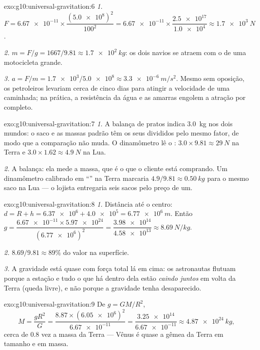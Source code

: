 \begin{solution}{exo:g10:universal-gravitation:6}
\emph{1.} $F = \num{6.67e-11} \times
\dfrac{(\num{5.0e8})^2}{100^2}
= \num{6.67e-11} \times \dfrac{\num{2.5e17}}{\num{1.0e4}}
\approx \qty{1.7e3}{N}$.

\emph{2.} $m = F/g = 1667/9.81 \approx \qty{1.7e2}{kg}$: os dois navios
se atraem com o  de uma motocicleta grande.

\emph{3.} $a = F/m = \num{1.7e3}/\num{5.0e8} \approx
\qty{3.3e-6}{m/s^2}$. Mesmo sem oposição, os petroleiros levariam cerca
de cinco dias para atingir a velocidade de uma caminhada; na prática, a
resistência da água e as amarras engolem a atração por completo.
\end{solution}

\begin{solution}{exo:g10:universal-gravitation:7}
\emph{1.} A balança de pratos indica \qty{3.0}{kg} nos dois mundos: o
saco e as massas padrão têm os seus  divididos pelo mesmo fator, de
modo que a comparação não muda. O dinamômetro lê o :
$3.0 \times 9.81 \approx \qty{29}{N}$ na Terra e
$3.0 \times 1.62 \approx \qty{4.9}{N}$ na Lua.

\emph{2.} A balança: ela mede a massa, que é o que o cliente está
comprando. Um dinamômetro calibrado em ``'' na Terra marcaria
$4.9/9.81 \approx \qty{0.50}{kg}$ para o mesmo saco na Lua --- o lojista
entregaria seis sacos pelo preço de um.
\end{solution}

\begin{solution}{exo:g10:universal-gravitation:8}
\emph{1.} Distância até o centro:
$d = R + h = \num{6.37e6} + \num{4.0e5} = \qty{6.77e6}{m}$. Então
$g = \dfrac{\num{6.67e-11} \times \num{5.97e24}}{(\num{6.77e6})^2}
= \dfrac{\num{3.98e14}}{\num{4.58e13}} \approx \qty{8.69}{N/kg}$.

\emph{2.} $8.69/9.81 \approx 89\%$ do valor na superfície.

\emph{3.} A gravidade está quase com força total lá em cima: os
astronautas flutuam porque a estação e tudo o que há dentro dela estão
\emph{caindo juntos} em volta da Terra (queda livre), e não porque a
gravidade tenha desaparecido.
\end{solution}

\begin{solution}{exo:g10:universal-gravitation:9}
De $g = GM/R^2$,
\[
M = \frac{g R^2}{G}
= \frac{8.87 \times (\num{6.05e6})^2}{\num{6.67e-11}}
= \frac{\num{3.25e14}}{\num{6.67e-11}}
\approx \qty{4.87e24}{kg},
\]
cerca de $0.8$ vez a massa da Terra --- Vênus é quase a gêmea da Terra em
tamanho e em massa.
\end{solution}

